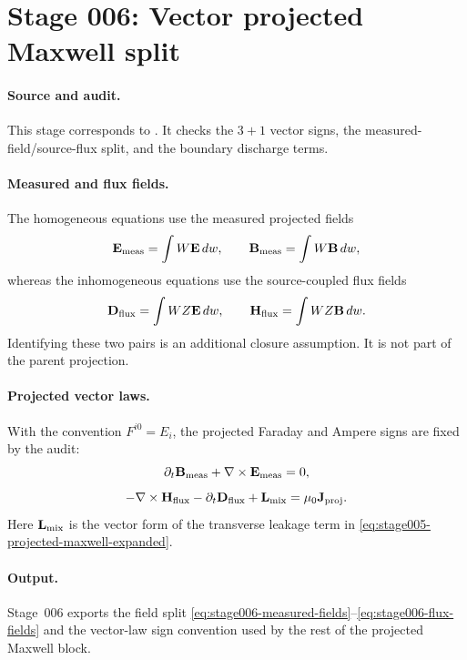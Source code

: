 \section[Stage 006]{Stage 006: Vector projected Maxwell split}
\label{stage:006}


\paragraph{Source and audit.}
This stage corresponds to
.
It checks the \(3+1\) vector signs, the measured-field/source-flux split, and
the boundary discharge terms.

\paragraph{Measured and flux fields.}
The homogeneous equations use the measured projected fields
\begin{equation}
\label{eq:stage006-measured-fields}
\mathbf E_{\rm meas}=\int W\mathbf E\,dw,
\qquad
\mathbf B_{\rm meas}=\int W\mathbf B\,dw,
\end{equation}
whereas the inhomogeneous equations use the source-coupled flux fields
\begin{equation}
\label{eq:stage006-flux-fields}
\mathbf D_{\rm flux}=\int WZ\mathbf E\,dw,
\qquad
\mathbf H_{\rm flux}=\int WZ\mathbf B\,dw.
\end{equation}
Identifying these two pairs is an additional closure assumption.  It is not
part of the parent projection.

\paragraph{Projected vector laws.}
With the convention \(F^{i0}=E_i\), the projected Faraday and Ampere signs are
fixed by the audit:
\begin{equation}
\partial_t\mathbf B_{\rm meas}+\nabla\times\mathbf E_{\rm meas}=0,
\end{equation}
\begin{equation}
\label{eq:stage006-ampere}
-\nabla\times\mathbf H_{\rm flux}-\partial_t\mathbf D_{\rm flux}
+\mathbf L_{\rm mix}=\mu_0\mathbf J_{\rm proj}.
\end{equation}
Here \(\mathbf L_{\rm mix}\) is the vector form of the transverse leakage term
in \eqref{eq:stage005-projected-maxwell-expanded}.

\paragraph{Output.}
Stage~006 exports the field split
\eqref{eq:stage006-measured-fields}--\eqref{eq:stage006-flux-fields}
and the vector-law sign convention used by the rest of the projected Maxwell
block.
